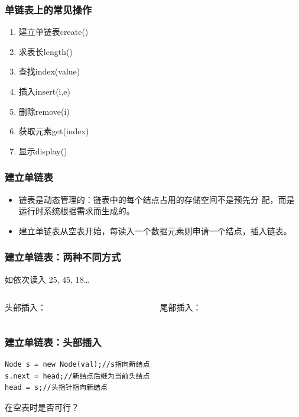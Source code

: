 \begin{frame}[fragile]
  \frametitle{单链表上的常见操作}
  \begin{enumerate}
  \item 建立单链表create()
  \item 求表长length()
  \item 查找index(value)
  \item 插入insert(i,e)
  \item 删除remove(i)
  \item 获取元素get(index)
  \item 显示display()
  \end{enumerate}
\end{frame}

\begin{frame}[fragile]
  \frametitle{建立单链表}
  \begin{itemize}
  \item 链表是{\color{red}动态管理}的：链表中的每个结点占用的存储空间不是预先分
    配，而是运行时系统根据需求而生成的。
  \item 建立单链表从空表开始，每读入一个数据元素则申请一个结点，插入链表。
  \end{itemize}
\end{frame}

\begin{frame}[fragile]
  \frametitle{建立单链表：两种不同方式}
  如依次读入  25, 45, 18…

  \begin{columns}
    \begin{column}[T]{.5\linewidth}
      头部插入：

      
    \end{column}
    \begin{column}[T]{.5\linewidth}
      尾部插入：

      
    \end{column}
  \end{columns}
\end{frame}

\begin{frame}[fragile]
  \frametitle{建立单链表：头部插入}

  \begin{center}
    
  \end{center}

  \begin{verbatim}
Node s = new Node(val);//s指向新结点
s.next = head;//新结点后继为当前头结点
head = s;//头指针指向新结点
  \end{verbatim}

  \pause
  \color{red} 在空表时是否可行？
\end{frame}


